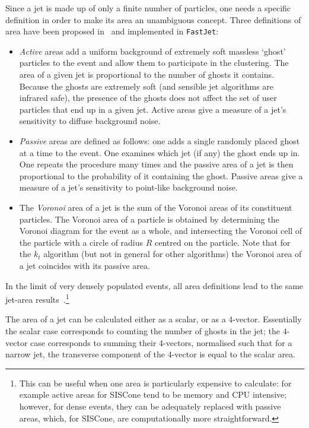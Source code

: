 \documentclass[12pt,a4]{article}
\newcommand{\fastjet}{\texttt{FastJet}\xspace}
\begin{document}
Since a jet is made up of only a finite number of particles, one needs
a specific definition in order to make its area an unambiguous
concept. Three definitions of area have been proposed
in~\cite{CSSAreas} and implemented in \fastjet:
\begin{itemize}
\item {\it Active} areas add a uniform background of extremely soft massless
  `ghost' particles to the event and allow them to participate in the
  clustering. The area of a given jet is proportional to the number of
  ghosts it contains. 
  Because the ghosts are extremely soft (and sensible jet algorithms
  are infrared safe), the presence of the ghosts does not affect the
  set of user particles that end up in a given jet.
  Active areas give a measure of a jet's sensitivity to diffuse
  background noise.

\item {\it Passive} areas are defined as follows: one adds a single randomly
  placed ghost at a time to the event. One examines which jet (if any)
  the ghost ends up in. One repeats the procedure many times and the
  passive area of a jet is then proportional to the probability of it
  containing the ghost.
  Passive areas give a measure of a jet's sensitivity to point-like
  background noise.

\item The {\it Voronoi} area of a jet is the sum of the Voronoi areas of its
  constituent particles. The Voronoi area of a particle is obtained by
  determining the Voronoi diagram for the event as a whole, and
  intersecting the Voronoi cell of the particle with a circle of
  radius $R$ centred on the particle. Note that for the $k_t$
  algorithm (but not in general for other algorithms) the Voronoi area
  of a jet coincides with its passive area.
\end{itemize}
In the limit of very densely populated events, all area definitions
lead to the same jet-area results~\cite{CSSAreas}.\footnote{This can
  be useful when one area is particularly expensive to calculate: for
  example active areas for SISCone tend to be memory and CPU
  intensive; however, for dense events, they can be adequately
  replaced with passive areas, which, for SISCone, are computationally
  more straightforward.}

The area of a jet can be calculated either as a scalar, or as a 4-vector.
Essentially the scalar case corresponds to counting the number of
ghosts in the jet; the $4$-vector case corresponds to summing their
4-vectors, normalised such that for a narrow jet, the transverse
component of the $4$-vector is equal to the scalar area.
\end{document}
